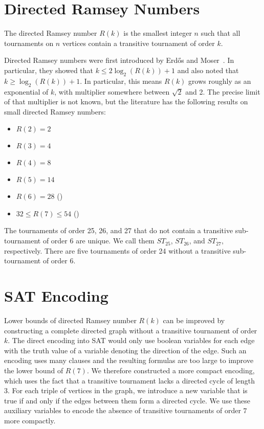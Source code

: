 \documentclass[conference]{IEEEtran}
\begin{document}
\section*{Directed Ramsey Numbers}
The directed Ramsey number $R(k)$ is the smallest integer $n$ such that all
tournaments on $n$ vertices contain a transitive tournament of order  $k$.

Directed Ramsey numbers were first introduced by Erd\H{o}s and Moser~\cite{ErdosMoser}. 
In particular, they showed that $k \leq 2 \log_2(R(k)) + 1$ and also noted that $k \geq \log_2(R(k)) + 1$. 
In particular, this means $R(k)$ grows roughly as an exponential of $k$, with multiplier somewhere
between $\sqrt{2}$ and 2. The precise limit of that multiplier is not known, but the literature has the following
results on small directed Ramsey numbers:

\begin{itemize}
\item $R(2) = 2$
\item $R(3) = 4$
\item $R(4) = 8$
\item $R(5) = 14$
\item $R(6) = 28$ (\cite{SanchezFlores55})
\item $32 \leq R(7) \leq 54$ (\cite{SanchezFlores54})
\end{itemize}

The tournaments of order 25, 26, and 27 that do not contain a 
transitive sub-tournament of order 6 are unique. We call them $ST_{25}$,
$ST_{26}$, and $ST_{27}$, respectively. There are five 
tournaments of order 24 without a transitive sub-tournament of order 6.



\section*{SAT Encoding}

Lower bounds of directed Ramsey number $R(k)$ can be improved by 
constructing a complete directed graph without a transitive tournament
of order $k$. The direct encoding into SAT would only use boolean 
variables for each edge with the truth value of a variable denoting 
the direction of the edge. Such an encoding uses many clauses and
the resulting formulas are too large to improve the lower bound of
$R(7)$. We therefore constructed a more compact encoding, which
uses the fact that a transitive tournament lacks a directed cycle of
length 3. For each triple of vertices in the graph, we introduce 
a new variable that is true if and only if the edges between them 
form a directed cycle. We use these auxiliary variables to encode 
the absence of transitive tournaments of order $7$ more 
compactly.
\end{document}
